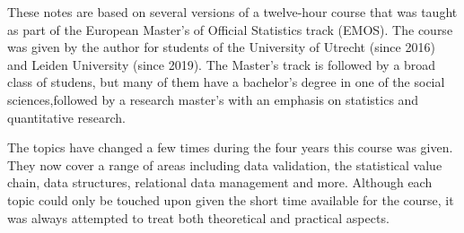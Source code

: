 
These notes are based on several versions of a twelve-hour course that was
taught as part of the European Master's of Official Statistics track (EMOS). The
course was given by the author for students of the University of Utrecht (since
2016) and Leiden University (since 2019). The Master's track is followed by a
broad class of studens, but many of them have a bachelor's degree in one of the
social sciences,followed by a research master's with an emphasis on statistics 
and quantitative research. 

The topics have changed a few times during the four years this course was given.
They now cover a range of areas including data validation, the statistical
value chain, data structures, relational data management and more. Although each
topic could only be touched upon given the short time available for the course,
it was always attempted to treat both theoretical and practical aspects. 

